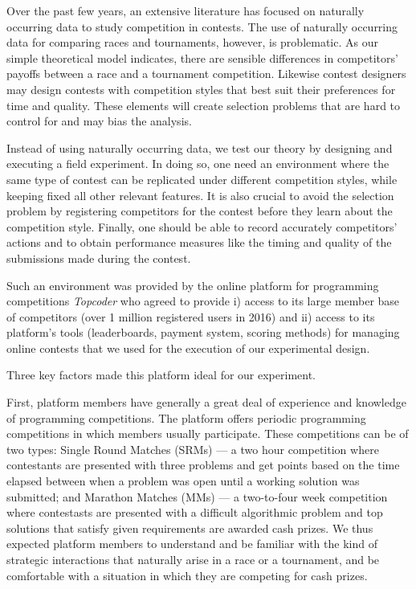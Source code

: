 \documentclass[10pt, titlepage]{article}
\begin{document}
Over the past few years, an extensive literature has focused on
naturally occurring data to study competition in contests. The use of
naturally occurring data for comparing races and tournaments, however,
is problematic. As our simple theoretical model indicates, there are
sensible differences in competitors' payoffs between a race and a
tournament competition. Likewise contest designers may design contests
with competition styles that best suit their preferences for time and
quality. These elements will create selection problems that are hard to
control for and may bias the analysis.

Instead of using naturally occurring data, we test our theory by
designing and executing a field experiment. In doing so, one need an
environment where the same type of contest can be replicated under
different competition styles, while keeping fixed all other relevant
features. It is also crucial to avoid the selection problem by
registering competitors for the contest before they learn about the
competition style. Finally, one should be able to record accurately
competitors' actions and to obtain performance measures like the timing
and quality of the submissions made during the contest.

Such an environment was provided by the online platform for programming
competitions \emph{Topcoder} who agreed to provide i) access to its
large member base of competitors (over 1 million registered users in
2016) and ii) access to its platform's tools (leaderboards, payment
system, scoring methods) for managing online contests that we used for
the execution of our experimental design.

Three key factors made this platform ideal for our experiment.

First, platform members have generally a great deal of experience and
knowledge of programming competitions. The platform offers periodic
programming competitions in which members usually participate. These
competitions can be of two types: Single Round Matches (SRMs) --- a two
hour competition where contestants are presented with three problems and
get points based on the time elapsed between when a problem was open
until a working solution was submitted; and Marathon Matches (MMs) --- a
two-to-four week competition where contestasts are presented with a
difficult algorithmic problem and top solutions that satisfy given
requirements are awarded cash prizes. We thus expected platform members
to understand and be familiar with the kind of strategic interactions
that naturally arise in a race or a tournament, and be comfortable with
a situation in which they are competing for cash prizes.
\end{document}
